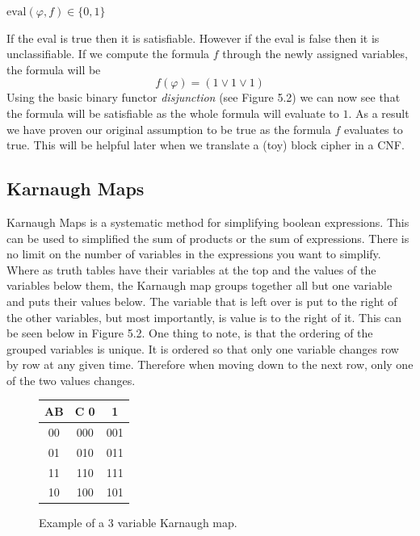 \documentclass[11pt,a4paper, notitlepage]{report}
\begin{document}
\begin{center}
$\text{eval} (\varphi, f) \in \{0,1\}$
\end{center}
If the eval is true then it is satisfiable. However if the eval is false then it is unclassifiable.
If we compute the formula $f$ through the newly assigned variables, the formula will be
\begin{displaymath}
f(\varphi) = (1 \lor 1 \lor 1)
\end{displaymath}
Using the basic binary functor \emph{disjunction} (see Figure 5.2) we can now see that the formula will be satisfiable as the whole formula will evaluate to $1$. As a result we have proven our original assumption to be true as the formula $f$ evaluates to true. This will be helpful later when we translate a (toy) block cipher in a CNF. 




\subsection{Karnaugh Maps}
\label{subsec:Karnaugh}
Karnaugh Maps is a systematic method for simplifying boolean expressions. This can be used to simplified the sum of products or the sum of expressions. There is no limit on the number of variables in the expressions you want to simplify. Where as truth tables have their variables at the top and the values of the variables below them, the Karnaugh map groups together all but one variable and puts their values below. The variable that is left over is put to the right of the other variables, but most importantly, is value is to the right of it. This can be seen below in Figure 5.2. One thing to note, is that the ordering of the grouped variables is unique. It is ordered so that only one variable changes row by row at any given time. Therefore when moving down to the next row, only one of the two values changes. 

\begin{figure}[H]
\centering
\label{Karnaugh5.2}
\begin{tabular}{|c||c|c|}
\hline
AB & C    0 & 1\\ \hline
\hline
00 & 000 & 001 \\ \hline
01 & 010 & 011 \\ \hline
11 & 110 & 111 \\ \hline
10 & 100 & 101 \\ \hline
\end{tabular}
\caption{Example of a 3 variable Karnaugh map.}
\end{figure}
\end{document}
